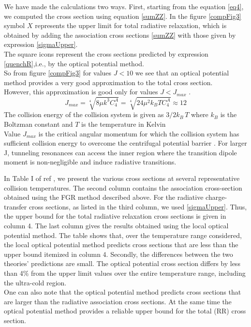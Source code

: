 We have made the calculations two ways. First, starting from the equation \eqref{eq4}, we computed the cross section using equation \eqref{sumZZ}. In the figure \ref{compFig3} symbol $ X $ represents the upper limit for total radiative relaxation, which is obtained by adding the association cross sections \eqref{sumZZ} with those given by expression \eqref{sigmaUpper}.\\
The square icons represent the cross sections predicted by expression \eqref{quenchR},i.e., by the optical potential method.\\
So from figure \ref{compFig3} for values $ J < 10 $ we see that an optical potential method provides a very good approximation to the total cross section.\\
However, this approximation is good only for values $ J < J_{max} $ \cite{ZygelmanHunt2012}.
\begin{equation}
  J_{max} = \sqrt[4]{8\mu k^3 C_4^A} = \sqrt[4]{24 \mu^2 k_B T C_4^A} \approx 12
\end{equation}
The collision energy of the collision system is given as $ 3/2 k_B\, T $ where $ k_B $ is the Boltzman constant and $ T $ is the temperature in Kelvin \\
Value $ J_{max} $ is the critical angular momentum for which the collision system has sufficient collision energy to overcome the centrifugal potential barrier \cite{ZygelmanHunt2012}. For larger J, tunneling resonances can access the inner region where the transition dipole moment is non-negligible and induce radiative transitions.

In Table I of ref \cite{ZL}, we present the various cross sections at several representative collision temperatures. The second column contains the association cross-section obtained using the FGR method described above. For the radiative charge-transfer cross sections, as listed in the third column, we used \eqref{sigmaUpper}. Thus, the upper bound for the total radiative relaxation cross sections is given in column 4. The last column gives the results obtained using the local optical potential method. The table shows that, over the temperature range considered, the local optical potential method predicts cross sections that are less than the upper bound itemized in column 4. Secondly, the differences between the two theories' predictions are small. The optical potential cross section differs by less than 4\%  from the upper limit values over the entire temperature range, including the ultra-cold region.\\
One can also note that the optical potential method predicts cross sections that are larger than the radiative association cross sections. At the same time the optical potential method provides a reliable upper bound for the total (RR) cross section.\\

